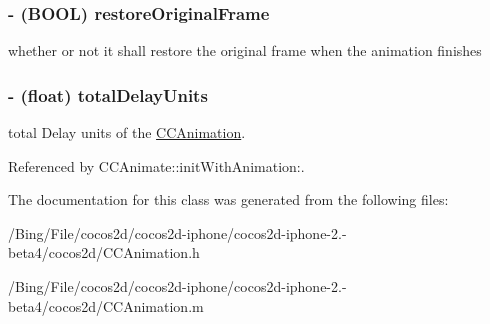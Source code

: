 \hypertarget{interface_c_c_animation_a1916fe4a2a89c8dc0bd38ca36b58cc27}{
\subsubsection[{restore\-Original\-Frame}]{\setlength{\rightskip}{0pt plus 5cm}-\/ (B\-O\-O\-L) {\bf restore\-Original\-Frame}}}\label{interface_c_c_animation_a1916fe4a2a89c8dc0bd38ca36b58cc27}
whether or not it shall restore the original frame when the animation finishes \hypertarget{interface_c_c_animation_aa196f8f838f3c0a0a7370265f752a201}{
\subsubsection[{total\-Delay\-Units}]{\setlength{\rightskip}{0pt plus 5cm}-\/ (float) {\bf total\-Delay\-Units}}}\label{interface_c_c_animation_aa196f8f838f3c0a0a7370265f752a201}
total Delay units of the \hyperlink{interface_c_c_animation}{C\-C\-Animation}. 

Referenced by C\-C\-Animate\-::init\-With\-Animation\-:.



The documentation for this class was generated from the following files\-:\begin{DoxyCompactItemize}
\item 
/\-Bing/\-File/cocos2d/cocos2d-\/iphone/cocos2d-\/iphone-\/2.-\/beta4/cocos2d/C\-C\-Animation.\-h\item 
/\-Bing/\-File/cocos2d/cocos2d-\/iphone/cocos2d-\/iphone-\/2.-\/beta4/cocos2d/C\-C\-Animation.\-m\end{DoxyCompactItemize}
